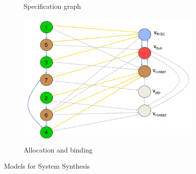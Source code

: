 \begin{figure}
\begin{center}
\begin{subfigure}[b]{0.45\textwidth}
			\caption{Specification graph}
		\end{subfigure}
		\hfill
		\begin{subfigure}[b]{0.45\textwidth}
			\includegraphics[width=\textwidth]{images/Allocation_binding.png}
			\caption{Allocation and binding}
		\end{subfigure}
		\caption{Models for System Synthesis}
		\label{fig:system_synthesis}
	\end{center}
\end{figure}

